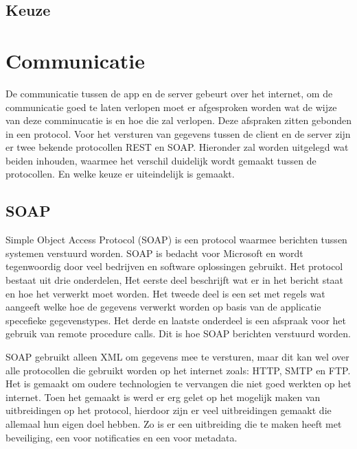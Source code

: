 \documentclass[a4paper,11pt,oneside]{report}
\begin{document}
\subsection{Keuze}

\section{Communicatie}
De communicatie tussen de app en de server gebeurt over het internet, om de
communicatie goed te laten verlopen moet er afgesproken worden wat de wijze van
deze comminucatie is en hoe die zal verlopen. Deze afspraken zitten gebonden in
een protocol. Voor het versturen van gegevens tussen de client en de server zijn
er twee bekende protocollen REST en SOAP. Hieronder zal worden uitgelegd wat
beiden inhouden, waarmee het verschil duidelijk wordt gemaakt tussen de
protocollen. En welke keuze er uiteindelijk is gemaakt.

\subsection{SOAP}
Simple Object Access Protocol (SOAP) is een protocol waarmee berichten tussen
systemen verstuurd worden. SOAP is bedacht voor Microsoft en wordt tegenwoordig
door veel bedrijven en software oplossingen gebruikt. Het protocol bestaat uit
drie onderdelen, Het eerste deel beschrijft wat er in het bericht staat en hoe
het verwerkt moet worden. Het tweede deel is een set met regels wat aangeeft
welke hoe de gegevens verwerkt worden op basis van de applicatie specefieke
gegevenstypes. Het derde en laatste onderdeel is een afspraak voor het gebruik
van remote procedure calls. Dit is hoe SOAP berichten verstuurd worden.

SOAP gebruikt alleen XML om gegevens mee te versturen, maar dit kan wel over
alle protocollen die gebruikt worden op het internet zoals: HTTP, SMTP en FTP.
Het is gemaakt om oudere technologien te vervangen die niet goed werkten op het
internet. Toen het gemaakt is werd er erg gelet op het mogelijk maken van
uitbreidingen op het protocol, hierdoor zijn er veel uitbreidingen\footnotemark
gemaakt die allemaal hun eigen doel hebben. Zo is er een uitbreiding die te
maken heeft met beveiliging, een voor notificaties en een voor metadata.
\end{document}
